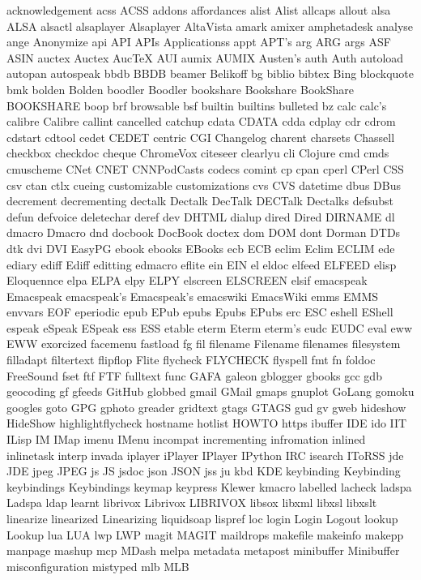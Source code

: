acknowledgement
acss
ACSS
addons
affordances
alist
Alist
allcaps
allout
alsa
ALSA
alsactl
alsaplayer
Alsaplayer
AltaVista
amark
amixer
amphetadesk
analyse
ange
Anonymize
api
API
APIs
Applicationss
appt
APT's
arg
ARG
args
ASF
ASIN
auctex
Auctex
AucTeX
AUI
aumix
AUMIX
Austen's
auth
Auth
autoload
autopan
autospeak
bbdb
BBDB
beamer
Belikoff
bg
biblio
bibtex
Bing
blockquote
bmk
bolden
Bolden
boodler
Boodler
bookshare
Bookshare
BookShare
BOOKSHARE
boop
brf
browsable
bsf
builtin
builtins
bulleted
bz
calc
calc's
calibre
Calibre
callint
cancelled
catchup
cdata
CDATA
cdda
cdplay
cdr
cdrom
cdstart
cdtool
cedet
CEDET
centric
CGI
Changelog
charent
charsets
Chassell
checkbox
checkdoc
cheque
ChromeVox
citeseer
clearlyu
cli
Clojure
cmd
cmds
cmuscheme
CNet
CNET
CNNPodCasts
codecs
comint
cp
cpan
cperl
CPerl
CSS
csv
ctan
ctlx
cueing
customizable
customizations
cvs
CVS
datetime
dbus
DBus
decrement
decrementing
dectalk
Dectalk
DecTalk
DECTalk
Dectalks
defsubst
defun
defvoice
deletechar
deref
dev
DHTML
dialup
dired
Dired
DIRNAME
dl
dmacro
Dmacro
dnd
docbook
DocBook
doctex
dom
DOM
dont
Dorman
DTDs
dtk
dvi
DVI
EasyPG
ebook
ebooks
EBooks
ecb
ECB
eclim
Eclim
ECLIM
ede
ediary
ediff
Ediff
editting
edmacro
eflite
ein
EIN
el
eldoc
elfeed
ELFEED
elisp
Eloquennce
elpa
ELPA
elpy
ELPY
elscreen
ELSCREEN
elsif
emacspeak
Emacspeak
emacspeak's
Emacspeak's
emacswiki
EmacsWiki
emms
EMMS
envvars
EOF
eperiodic
epub
EPub
epubs
Epubs
EPubs
erc
ESC
eshell
EShell
espeak
eSpeak
ESpeak
ess
ESS
etable
eterm
Eterm
eterm's
eudc
EUDC
eval
eww
EWW
exorcized
facemenu
fastload
fg
fil
filename
Filename
filenames
filesystem
filladapt
filtertext
flipflop
Flite
flycheck
FLYCHECK
flyspell
fmt
fn
foldoc
FreeSound
fset
ftf
FTF
fulltext
func
GAFA
galeon
gblogger
gbooks
gcc
gdb
geocoding
gf
gfeeds
GitHub
globbed
gmail
GMail
gmaps
gnuplot
GoLang
gomoku
googles
goto
GPG
gphoto
greader
gridtext
gtags
GTAGS
gud
gv
gweb
hideshow
HideShow
highlightflycheck
hostname
hotlist
HOWTO
https
ibuffer
IDE
ido
IIT
ILisp
IM
IMap
imenu
IMenu
incompat
incrementing
infromation
inlined
inlinetask
interp
invada
iplayer
iPlayer
IPlayer
IPython
IRC
isearch
IToRSS
jde
JDE
jpeg
JPEG
js
JS
jsdoc
json
JSON
jss
ju
kbd
KDE
keybinding
Keybinding
keybindings
Keybindings
keymap
keypress
Klewer
kmacro
labelled
lacheck
ladspa
Ladspa
ldap
learnt
librivox
Librivox
LIBRIVOX
libsox
libxml
libxsl
libxslt
linearize
linearized
Linearizing
liquidsoap
lispref
loc
login
Login
Logout
lookup
Lookup
lua
LUA
lwp
LWP
magit
MAGIT
maildrops
makefile
makeinfo
makepp
manpage
mashup
mcp
MDash
melpa
metadata
metapost
minibuffer
Minibuffer
misconfiguration
mistyped
mlb
MLB
